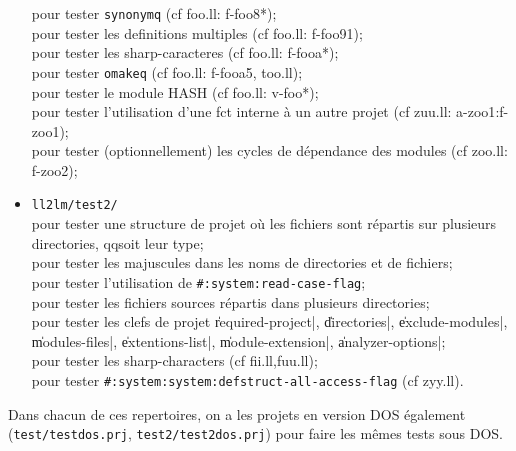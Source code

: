 \begin{itemize}
pour tester {\tt synonymq} (cf foo.ll: f-foo8*);\\
pour tester les definitions multiples (cf foo.ll: f-foo91);\\
pour tester les sharp-caracteres (cf foo.ll: f-fooa*);\\
pour tester {\tt omakeq} (cf foo.ll: f-fooa5, too.ll);\\
pour tester le module HASH (cf foo.ll: v-foo*);\\
pour tester l'utilisation d'une fct interne \`{a} un autre projet (cf
zuu.ll: {a-zoo1}:f-zoo1);\\
pour tester (optionnellement) les cycles de d\'{e}pendance des modules
(cf zoo.ll: f-zoo2);\\

\item{\tt ll2lm/test2/}\\
pour tester une structure de projet o\`{u} les fichiers sont r\'{e}partis
sur plusieurs directories, qqsoit leur type;\\
pour tester les majuscules dans les noms de directories et de
fichiers;\\
pour tester l'utilisation de {\tt \#:system:read-case-flag};\\
pour tester les fichiers sources r\'{e}partis dans plusieurs directories;\\
pour tester les clefs de projet \|required-project|, \|directories|,
\|exclude-modules|, \|modules-files|, \|extentions-list|,
\|module-extension|, \|analyzer-options|;\\
pour tester les sharp-characters (cf fii.ll,fuu.ll);\\
pour tester {\tt \#:system:system:defstruct-all-access-flag} (cf
zyy.ll).\\

\end{itemize}

Dans chacun de ces repertoires, on a les projets en version DOS
\'{e}galement ({\tt test/testdos.prj}, {\tt test2/test2dos.prj})
pour faire les m\^{e}mes tests sous DOS.

\End

